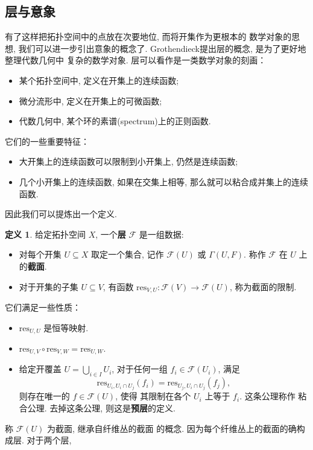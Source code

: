 \documentclass[UTF8]{ctexbook}
\theoremstyle{plain}
\theoremstyle{definition}
\newtheorem{definition}{定义}[chapter]
\theoremstyle{remark}
\begin{document}
\subsection{层与意象}
有了这样把拓扑空间中的点放在次要地位, 而将开集作为更根本的
数学对象的思想, 我们可以进一步引出意象的概念了.
Grothendieck提出层的概念, 是为了更好地整理代数几何中
复杂的数学对象. 层可以看作是一类数学对象的刻画：
\begin{itemize}
\item 某个拓扑空间中, 定义在开集上的连续函数;
\item 微分流形中, 定义在开集上的可微函数;
\item 代数几何中, 某个环的素谱(spectrum)上的正则函数. \cite[第二章, 例1.0.1]{hartshorne:1977:ag}
\end{itemize}
它们的一些重要特征：
\begin{itemize}
\item 大开集上的连续函数可以限制到小开集上, 仍然是连续函数;
\item 几个小开集上的连续函数, 如果在交集上相等, 那么就可以粘合成并集上的连续函数.
\end{itemize}
因此我们可以提炼出一个定义.
\begin{definition}
给定拓扑空间 \(X\), 一个\textbf{层} \(\mathscr F\) 是一组数据:
\begin{itemize}
\item 对每个开集 \(U \subseteq X\) 取定一个集合,
记作 \(\mathscr F(U)\) 或 \(\Gamma(U, F)\).
称作 \(\mathscr F\) 在 \(U\) 上的\textbf{截面}.
\item 对于开集的子集 \(U \subseteq V\), 有函数
\(\mathrm{res}_{V,U} : \mathscr F(V) \to \mathscr F(U)\),
称为截面的限制.
\end{itemize}
它们满足一些性质：
\begin{itemize}
\item \(\mathrm{res}_{U,U}\) 是恒等映射.
\item \(\mathrm{res}_{U, V}\circ \mathrm{res}_{V,W} = \mathrm{res}_{U, W}\).
\item 给定开覆盖 \(U = \bigcup_{i\in I} U_i\),
对于任何一组 \(f_i \in \mathcal F(U_i)\), 满足
\[\mathrm{res}_{U_i, U_i \cap U_j}(f_i)
= \mathrm{res}_{U_j, U_i \cap U_j}(f_j),\]
则存在唯一的 \(f \in \mathcal F(U)\), 使得
其限制在各个 \(U_i\) 上等于 \(f_i\). 这条公理称作
粘合公理. 去掉这条公理, 则这是\textbf{预层}的定义.
\end{itemize}
\end{definition}
称 \(\mathscr F(U)\) 为截面, 继承自纤维丛的截面
的概念. 因为每个纤维丛上的截面的确构成层. 对于两个层,
\end{document}
